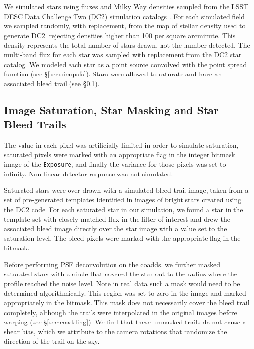 \documentclass[twocolumn,twocolappendix,astrosym]{openjournal}
\newcommand{\calexp}{\texttt{Exposure}}
\begin{document}
We simulated stars using fluxes and Milky Way densities sampled from the LSST
DESC Data Challenge Two (DC2) simulation catalogs \citep{DC2Abolfathi2021}.
For each simulated field we sampled randomly, with replacement, from the map of
stellar density used to generate DC2, rejecting densities higher than 100 per
square arcminute.  This density represents the total number of stars drawn, not
the number detected.  The multi-band flux for each star was sampled with
replacement from the DC2 star catalog.  We modeled each star as a point
source convolved with the point spread function
(see \S \ref{sec:sim:psfs}).  Stars were allowed to saturate and have an
associated bleed trail (see \S \ref{sec:sim:satbleeds}).

\subsection{Image Saturation, Star Masking and Star Bleed Trails} \label{sec:sim:satbleeds}

The value in each pixel was artificially limited in order to simulate
saturation, saturated pixels were marked with an appropriate flag in the
integer bitmask image of the \calexp, and finally the variance for those
pixels was set to infinity.  Non-linear detector response was not simulated.

Saturated stars were over-drawn with a simulated bleed trail image, taken from
a set of pre-generated templates identified in images of bright stars created
using the DC2 code.  For each saturated star in our simulation, we found a star
in the template set with closely matched flux in the filter of interest and
drew the associated bleed image directly over the star image with a value set
to the saturation level.  The bleed pixels were marked with the appropriate
flag in the bitmask.

Before performing PSF deconvolution on the coadds, we further masked
saturated stars with a circle that covered the star out to the radius
where the profile reached the noise level.  Note in real data such a mask would
need to be determined algorithmically. This region was set to zero in the image
and marked appropriately in the bitmask.   This mask does not necessarily cover
the bleed trail completely, although the trails were interpolated in the
original images before warping (see \S \ref{sec:coadding}).  We find that these
unmasked trails do not cause a shear bias, which we attribute to the camera
rotations that randomize the direction of the trail on the sky.
\end{document}
